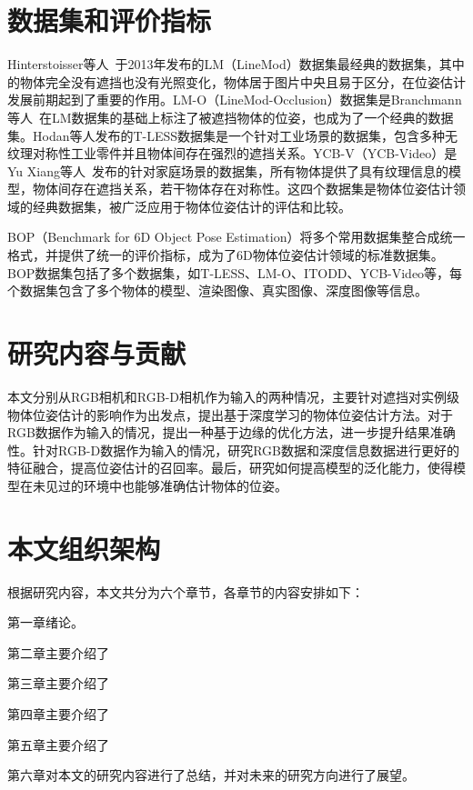 \section{数据集和评价指标}
\par Hinterstoisser等人~\cite{lm}于2013年发布的LM（LineMod）数据集最经典的数据集，其中的物体完全没有遮挡也没有光照变化，物体居于图片中央且易于区分，在位姿估计发展前期起到了重要的作用。LM-O（LineMod-Occlusion）数据集是Branchmann等人~\cite{lmo}在LM数据集的基础上标注了被遮挡物体的位姿，也成为了一个经典的数据集。Hodan等人\cite{tless}发布的T-LESS数据集是一个针对工业场景的数据集，包含多种无纹理对称性工业零件并且物体间存在强烈的遮挡关系。YCB-V（YCB-Video）是Yu Xiang等人~\cite{ycbv}发布的针对家庭场景的数据集，所有物体提供了具有纹理信息的模型，物体间存在遮挡关系，若干物体存在对称性。这四个数据集是物体位姿估计领域的经典数据集，被广泛应用于物体位姿估计的评估和比较。
\par BOP（Benchmark for 6D Object Pose Estimation）\cite{hodan2018bop}将多个常用数据集整合成统一格式，并提供了统一的评价指标，成为了6D物体位姿估计领域的标准数据集。BOP数据集包括了多个数据集，如T-LESS、LM-O、ITODD、YCB-Video等，每个数据集包含了多个物体的模型、渲染图像、真实图像、深度图像等信息。
\section {研究内容与贡献}
\par 本文分别从RGB相机和RGB-D相机作为输入的两种情况，主要针对遮挡对实例级物体位姿估计的影响作为出发点，提出基于深度学习的物体位姿估计方法。对于RGB数据作为输入的情况，提出一种基于边缘的优化方法，进一步提升结果准确性。针对RGB-D数据作为输入的情况，研究RGB数据和深度信息数据进行更好的特征融合，提高位姿估计的召回率。最后，研究如何提高模型的泛化能力，使得模型在未见过的环境中也能够准确估计物体的位姿。
\section{本文组织架构}
\par 根据研究内容，本文共分为六个章节，各章节的内容安排如下：
\par 第一章绪论。
\par 第二章主要介绍了
\par 第三章主要介绍了
\par 第四章主要介绍了
\par 第五章主要介绍了
\par 第六章对本文的研究内容进行了总结，并对未来的研究方向进行了展望。